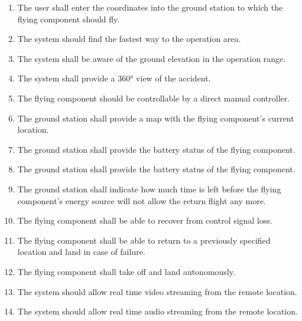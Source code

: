 \begin{enumerate}[label=\bfseries F \arabic*:]
  \item The user shall enter the coordinates into the ground station to which the flying component should fly.
  \item The system should find the fastest way to the operation area.
  \item The system shall be aware of the ground elevation in the operation range.
  \item The system shall provide a 360° view of the accident.
  \item The flying component should be controllable by a direct manual controller.
  \item The ground station shall provide a map with the flying component’s current location.
  \item The ground station shall provide the battery status of the flying component.
  \item The ground station shall provide the battery status of the flying component.
  \item The ground station shall indicate how much time is left before the flying component’s energy source will not allow the return flight any more.
  \item The flying component shall be able to recover from control signal loss.
  \item The flying component shall be able to return to a previously specified location and land in case of failure.
  \item The flying component shall take off and land autonomously.
  \item The system should allow real time video streaming from the remote location.
  \item The system should allow real time audio streaming from the remote location.
\end{enumerate}

